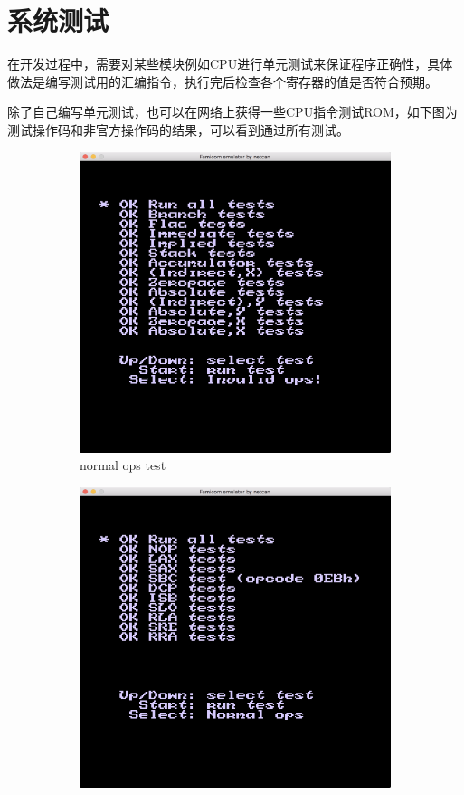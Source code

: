 \documentclass[a4paper]{ltxdoc}
\begin{document}
{\section{系统测试}
在开发过程中，需要对某些模块例如CPU进行单元测试来保证程序正确性，具体做法是编写测试用的汇编指令，执行完后检查各个寄存器的值是否符合预期。

除了自己编写单元测试，也可以在网络上获得一些CPU指令测试ROM，如下图为测试操作码和非官方操作码的结果，可以看到通过所有测试。

\begin{figure}[h]
	\centering
		\begin{subfigure}[b]{0.49\textwidth}
			\includegraphics[width=\textwidth]{images/run_all_tests_normal_ops.png}
			\caption{normal ops test}
		\end{subfigure}
		\begin{subfigure}[b]{0.49\textwidth}
			\includegraphics[width=\textwidth]{images/run_all_tests_invalid_ops.png}

\end{subfigure}
\end{figure}}
\end{document}
